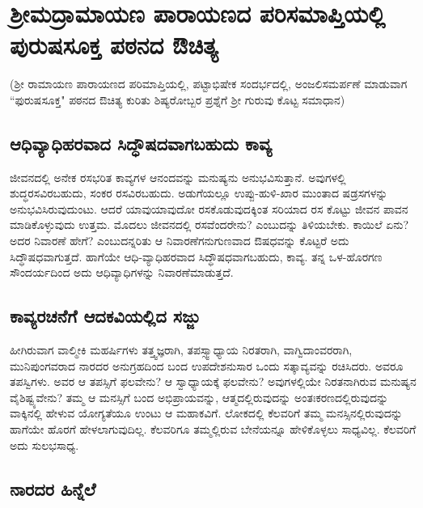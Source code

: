 \chapter{ಶ್ರೀಮದ್ರಾಮಾಯಣ ಪಾರಾಯಣದ ಪರಿಸಮಾಪ್ತಿಯಲ್ಲಿ ಪುರುಷಸೂಕ್ತ ಪಠನದ ಔಚಿತ್ಯ}

(ಶ್ರೀ ರಾಮಾಯಣ ಪಾರಾಯಣದ ಪರಿಮಾಪ್ತಿಯಲ್ಲಿ, ಪಟ್ಟಾಭಿಷೇಕ ಸಂದರ್ಭದಲ್ಲಿ, ಅಂಜಲಿಸಮರ್ಪಣೆ ಮಾಡುವಾಗ ``ಫುರುಷಸೂಕ್ತ" ಪಠನದ ಔಚಿತ್ಯ ಕುರಿತು ಶಿಷ್ಯರೋಬ್ಬರ ಪ್ರಶ್ನೆಗೆ ಶ್ರೀ ಗುರುವು ಕೊಟ್ಟ ಸಮಾಧಾನ)

\section*{ಆಧಿವ್ಯಾಧಿಹರವಾದ ಸಿದ್ಧೌಷದವಾಗಬಹುದು ಕಾವ್ಯ}

ಜೀವನದಲ್ಲಿ ಅನೇಕ ರಸಭರಿತ ಕಾವ್ಯಗಳ ಆನಂದವನ್ನು ಮನುಷ್ಯನು ಅನುಭವಿಸುತ್ತಾನೆ. ಅವುಗಳಲ್ಲಿ ಶುದ್ಧರಸವಿರಬಹುದು, ಸಂಕರ ರಸವಿರಬಹುದು. ಅಡುಗೆಯಲ್ಲೂ ಉಪ್ಪು-ಹುಳಿ-ಖಾರ ಮುಂತಾದ ಷಡ್ರಸಗಳನ್ನು ಅನುಭವಿಸಿರುವುದುಂಟು. ಆದರೆ ಯಾವುಯಾವುದೋ ರಸಕೊಡುವುದಕ್ಕಿಂತ ಸರಿಯಾದ ರಸ ಕೊಟ್ಟು ಜೀವನ ಪಾವನ ಮಾಡಿಕೊಳ್ಳುವುದು ಉತ್ತಮ. ಮೊದಲು ಜೀವನದಲ್ಲಿ ರಸವೆಂದರೇನು? ಎಂಬುದನ್ನು ತಿಳಿಯಬೇಕು. ಕಾಯಿಲೆ ಏನು? ಅದರ ನಿವಾರಣೆ ಹೇಗೆ? ಎಂಬುದನ್ನರಿತು ಆ ನಿವಾರಣೆಗನುಗುಣವಾದ ಔಷಧವನ್ನು ಕೊಟ್ಟರೆ ಅದು ಸಿದ್ಧೌಷಧವಾಗುತ್ತದೆ. ಹಾಗೆಯೇ ಆಧಿ-ವ್ಯಾಧಿಹರವಾದ ಸಿದ್ಧೌಷಧವಾಗಬಹುದು, ಕಾವ್ಯ. ತನ್ನ ಒಳ-ಹೊರಗಣ ಸೌಂದರ್ಯದಿಂದ ಅದು ಆಧಿವ್ಯಾಧಿಗಳನ್ನು ನಿವಾರಣೆಮಾಡುತ್ತದೆ. 

\section*{ಕಾವ್ಯರಚನೆಗೆ ಆದಕವಿಯಲ್ಲಿದ ಸಜ್ಜು}

ಹೀಗಿರುವಾಗ ವಾಲ್ಮೀಕಿ ಮಹರ್ಷಿಗಳು ತತ್ತ್ವಜ್ಞರಾಗಿ, ತಪಸ್ಸ್ವಾಧ್ಯಾಯ ನಿರತರಾಗಿ, ವಾಗ್ವಿದಾಂವರರಾಗಿ, ಮುನಿಪುಂಗವರಾದ ನಾರದರ ಅನುಗ್ರಹದಿಂದ ಬಂದ ಉಪದೇಶನುಸಾರ ಒಂದು ಸತ್ಕಾವ್ಯವನ್ನು ರಚಿಸಿದರು. ಅವರೂ ತಪಸ್ವಿಗಳು. ಅವರ ಆ ತಪಸ್ಸಿಗೆ ಫಲವೇನು? ಆ ಸ್ವಾಧ್ಯಾಯಕ್ಕೆ ಫಲವೇನು? ಅವುಗಳಲ್ಲಿಯೇ ನಿರತನಾಗಿರುವ ಮನುಷ್ಯನ ವೈಶಿಷ್ಟ್ಯವೇನು? ತಮ್ಮ ಆ ಮನಸ್ಸಿಗೆ ಬಂದ ಅಭಿಪ್ರಾಯವನ್ನು, ಆತ್ಮದಲ್ಲಿರುವುದನ್ನು ಅಂತಃಕರಣದಲ್ಲಿರುವುದನ್ನು ವಾಕ್ಕಿನಲ್ಲಿ ಹೇಳುವ ಯೋಗ್ಯತೆಯೂ ಉಂಟು ಆ ಮಹಾಕವಿಗೆ. ಲೋಕದಲ್ಲಿ ಕೆಲವರಿಗೆ ತಮ್ಮ ಮನಸ್ಸಿನಲ್ಲಿರುವುದನ್ನು ಹಾಗೆಯೇ ಹೊರಗೆ ಹೇಳಲಾಗುವುದಿಲ್ಲ. ಕೆಲವರಿಗೂ ತಮ್ಮಲ್ಲಿರುವ ಬೇನೆಯನ್ನೂ ಹೇಳಿಕೊಳ್ಳಲು ಸಾಧ್ಯವಿಲ್ಲ. ಕೆಲವರಿಗೆ ಅದು ಸುಲಭಸಾಧ್ಯ.

\section*{ನಾರದರ ಹಿನ್ನೆಲೆ}

